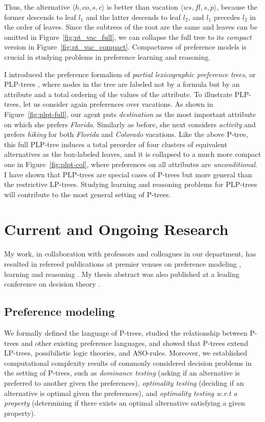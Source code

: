 \documentclass[11pt]{article}
\newcommand{\figref}[1]{Figure~\ref{fig:#1}}
\begin{document}
Thus, the alternative $\langle h, co, s, c \rangle$ is better than
vacation $\langle ws, fl, s, p\rangle$, 
because the former descends to leaf $l_1$ and the latter descends to leaf $l_2$, and $l_1$
precedes $l_2$ in the order of leaves.
Since the subtrees of the root are the same and leaves can be omitted in \figref{pt_vac_full},
we can collapse the full tree to its \textit{compact} version in \figref{pt_vac_compact}.
Compactness of preference models is
crucial in studying problems in preference learning and reasoning.

I introduced the preference formalism of \textit{partial lexicographic preference trees},
or PLP-trees \cite{LiuT:Learn_PLPTrees}, where nodes in the tree are labeled not by a formula 
but by an attribute and a total ordering of the values of the attribute.
To illustrate PLP-trees, let us consider again preferences over vacations.
As shown in \figref{plpt-full}, our agent puts \textit{destination} as the most important attribute on which
she prefers \textit{Florida}.
Similarly as before, she next considers \textit{activity} and prefers 
\textit{hiking} for both \textit{Florida} and \textit{Colorado} vacations.
Like the above P-tree, this full PLP-tree induces a total preorder of four 
clusters of equivalent alternatives as the box-labeled leaves, and it is collapsed to a
much more compact one in \figref{plpt-col}, where 
preferences on all attributes are \textit{unconditional}.
I have shown that PLP-trees are special cases of 
P-trees but more general than the restrictive LP-trees.
Studying learning and reasoning problems for PLP-trees will contribute
to the most general setting of P-trees.


\section{Current and Ongoing Research}
\noindent My work, in collaboration with professors and colleagues in our department,
has resulted in refereed publications at premier venues on preference modeling \cite{wsh/mpref14/LiuT,LiuT:PT}, learning
\cite{LiuT:Learn_PLPTrees} and reasoning \cite{LiuT:LPT_ASP_EA,LiuT:LPT_ASP,Spradling}.
My thesis abstract was also published at a leading conference on decision theory \cite{Liu:TA}.

\subsection{Preference modeling}
\noindent We formally defined the language of P-trees,
studied the relationship between P-trees and other existing preference languages, and
showed that P-trees extend  
LP-trees, possibilistic logic theories, and ASO-rules\cite{wsh/mpref14/LiuT,LiuT:PT}.
Moreover, we established computational complexity results of commonly considered decision
problems in the setting of P-trees, such as \textit{dominance testing} 
(asking if an alternative is preferred to another given the preferences),
\textit{optimality testing} (deciding if an alternative is optimal given the preferences), and
\textit{optimality testing w.r.t a property} (determining if there exists an optimal alternative
satisfying a given property).
\end{document}
